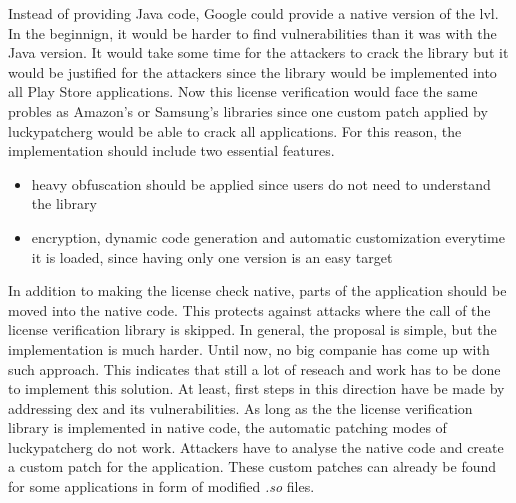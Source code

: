 \newline
Instead of providing Java code, Google could provide a native version of the \gls{lvl}.
In the beginnign, it would be harder to find vulnerabilities than it was with the Java version.
It would take some time for the attackers to crack the library but it would be justified for the attackers since the library would be implemented into all Play Store applications.
Now this license verification would face the same probles as Amazon's or Samsung's libraries since one custom patch applied by \gls{luckypatcherg} would be able to crack all applications.
For this reason, the implementation should include two essential features.
\begin{itemize}
\item heavy obfuscation should be applied since users do not need to understand the library
\item encryption, dynamic code generation and automatic customization everytime it is loaded, since having only one version is an easy target
\end{itemize}
In addition to making the license check native, parts of the application should be moved into the native code.
This protects against attacks where the call of the license verification library is skipped.
\newline
In general, the proposal is simple, but the implementation is much harder.
Until now, no big companie has come up with such approach.
This indicates that still a lot of reseach and work has to be done to implement this solution.
At least, first steps in this direction have be made by addressing dex and its vulnerabilities. \cite{munteanLicense}
\newline
As long as the the license verification library is implemented in native code, the automatic patching modes of \gls{luckypatcherg} do not work.
Attackers have to analyse the native code and create a custom patch for the application.
These custom patches can already be found for some applications in form of modified \textit{.so} files.

